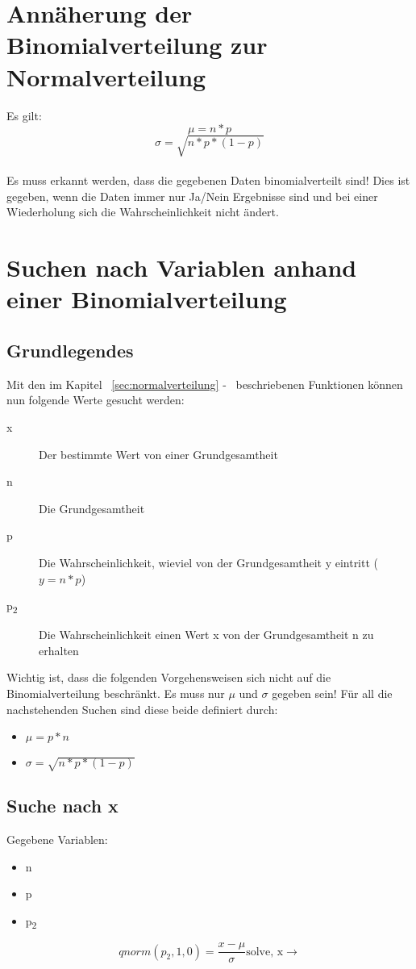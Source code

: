 \documentclass[a4paper,10pt]{article}
\begin{document}
\section{Annäherung der Binomialverteilung zur Normalverteilung}
Es gilt:
\begin{equation}
  \mu = n * p
\end{equation}
\begin{equation}
  \sigma = \sqrt{n * p * (1 - p)}
\end{equation}
\\
Es muss erkannt werden, dass die gegebenen Daten binomialverteilt
sind! Dies ist gegeben, wenn die Daten immer nur Ja/Nein Ergebnisse
sind und bei einer Wiederholung sich die Wahrscheinlichkeit nicht
ändert.
\section{Suchen nach Variablen anhand einer Binomialverteilung}
\subsection{Grundlegendes}
\label{sec:variabliensuchebinomialverteilunggrundlegendes}
Mit den im Kapitel ~\autoref{sec:normalverteilung}
-~ beschriebenen Funktionen können nun
folgende Werte gesucht werden:
\begin{description}
\item[x] Der bestimmte Wert von einer Grundgesamtheit
\item[n] Die Grundgesamtheit
\item[p] Die Wahrscheinlichkeit, wieviel von der Grundgesamtheit y
  eintritt ($ y = n * p $)
\item[p\textsubscript{2}] Die Wahrscheinlichkeit einen Wert x von der
  Grundgesamtheit n zu erhalten
\end{description}
Wichtig ist, dass die folgenden Vorgehensweisen sich nicht auf die
Binomialverteilung beschränkt. Es muss nur $ \mu $ und $ \sigma $
gegeben sein! Für all die nachstehenden Suchen sind diese beide
definiert durch:
\begin{itemize}
\item $\mu = p * n $
\item $ \sigma = \sqrt{n * p * (1  - p)} $
\end{itemize}

\subsection{Suche nach x}
Gegebene Variablen:
\begin{itemize}
\item n
\item p
\item p\textsubscript{2}
\end{itemize}
\begin{equation}
  qnorm(p_2, 1, 0) = \frac{x -\mu}{\sigma} \text{solve, x} \rightarrow
\end{equation}
\end{document}
